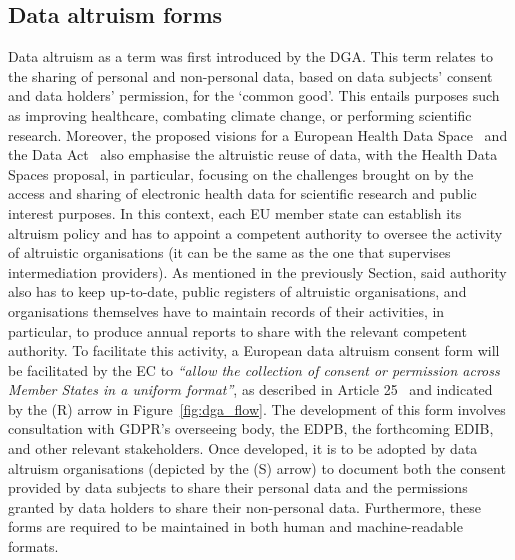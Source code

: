 \subsection{Data altruism forms}
\label{sec:altruism}

Data altruism as a term was first introduced by the DGA.
This term relates to the sharing of personal and non-personal data, based on data subjects' consent and data holders' permission, for the `common good'.
This entails purposes such as improving healthcare, combating climate change, or performing scientific research.
Moreover, the proposed visions for a European Health Data Space~\citeyearpar{noauthor_proposal_2022} and the Data Act~\citeyearpar{noauthor_dataact_2022} also emphasise the altruistic reuse of data, with the Health Data Spaces proposal, in particular, focusing on the challenges brought on by the access and sharing of electronic health data for scientific research and public interest purposes.
In this context, each EU member state can establish its altruism policy and has to appoint a competent authority to oversee the activity of altruistic organisations (it can be the same as the one that supervises intermediation providers).
As mentioned in the previously Section, said authority also has to keep up-to-date, public registers of altruistic organisations, and organisations themselves have to maintain records of their activities, in particular, to produce annual reports to share with the relevant competent authority.
To facilitate this activity, a European data altruism consent form will be facilitated by the EC to \textit{``allow the collection of consent or permission across Member States in a uniform format''}, as described in Article 25~\citeyearpar{noauthor_regulation_2022} and indicated by the (R) arrow in Figure~\ref{fig:dga_flow}.
The development of this form involves consultation with GDPR's overseeing body, the EDPB, the forthcoming EDIB, and other relevant stakeholders.
Once developed, it is to be adopted by data altruism organisations (depicted by the (S) arrow) to document both the consent provided by data subjects to share their personal data and the permissions granted by data holders to share their non-personal data.
Furthermore, these forms are required to be maintained in both human and machine-readable formats.

